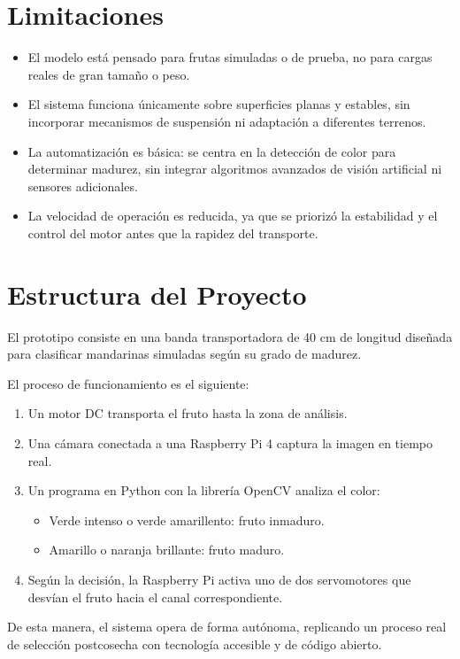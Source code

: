 \section{Limitaciones}
\begin{itemize}
    \item El modelo está pensado para frutas simuladas o de prueba, no para cargas reales de gran tamaño o peso.
    \item El sistema funciona únicamente sobre superficies planas y estables, sin incorporar mecanismos de suspensión ni adaptación a diferentes terrenos.
    \item La automatización es básica: se centra en la detección de color para determinar madurez, sin integrar algoritmos avanzados de visión artificial ni sensores adicionales.
    \item La velocidad de operación es reducida, ya que se priorizó la estabilidad y el control del motor antes que la rapidez del transporte.
\end{itemize}

\section{Estructura del Proyecto}
El prototipo consiste en una banda transportadora de 40 cm de longitud diseñada para clasificar mandarinas simuladas según su grado de madurez.

El proceso de funcionamiento es el siguiente:
\begin{enumerate}
    \item Un motor DC transporta el fruto hasta la zona de análisis.
    \item Una cámara conectada a una Raspberry Pi 4 captura la imagen en tiempo real.
    \item Un programa en Python con la librería OpenCV analiza el color:
    \begin{itemize}
        \item Verde intenso o verde amarillento: fruto inmaduro.
        \item Amarillo o naranja brillante: fruto maduro.
    \end{itemize}
    \item Según la decisión, la Raspberry Pi activa uno de dos servomotores que desvían el fruto hacia el canal correspondiente.
\end{enumerate}

De esta manera, el sistema opera de forma autónoma, replicando un proceso real de selección postcosecha con tecnología accesible y de código abierto.

